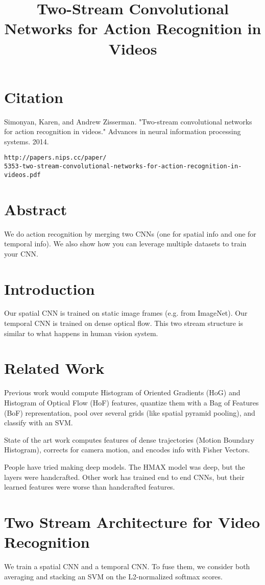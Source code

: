 \documentclass[a4paper]{article}
\title{Two-Stream Convolutional Networks for Action Recognition in Videos}
\date{}
\begin{document}
\maketitle

\section{Citation}
Simonyan, Karen, and Andrew Zisserman. "Two-stream convolutional networks for action recognition in videos." Advances in neural information processing systems. 2014.

\begin{verbatim}
http://papers.nips.cc/paper/
5353-two-stream-convolutional-networks-for-action-recognition-in-videos.pdf 
\end{verbatim}

\section{Abstract}
We do action recognition by merging two CNNs (one for spatial info and one
for temporal info). We also show how you can leverage multiple datasets to
train your CNN.

\section{Introduction}
Our spatial CNN is trained on static image frames (e.g. from ImageNet). Our
temporal CNN is trained on dense optical flow. This two stream structure
is similar to what happens in human vision system.

\section{Related Work}
Previous work would compute Histogram of Oriented Gradients (HoG) and 
Histogram of Optical Flow (HoF) features, quantize them with a Bag of Features
(BoF) representation, pool over several grids (like spatial pyramid pooling),
and classify with an SVM.

State of the art work computes features of dense trajectories (Motion Boundary
Histogram), corrects for camera motion, and encodes info with Fisher Vectors.

People have tried making deep models. The HMAX model was deep, but the layers
were handcrafted. Other work has trained end to end CNNs, but their learned
features were worse than handcrafted features.

\section{Two Stream Architecture for Video Recognition}
We train a spatial CNN and a temporal CNN. To fuse them, we consider both
averaging and stacking an SVM on the L2-normalized softmax scores.
\end{document}
